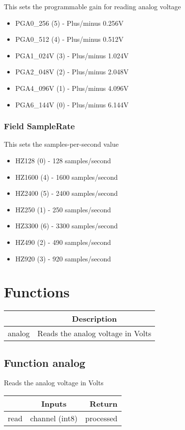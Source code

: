\documentclass[a4paper,12pt,oneside,pdflatex,italian,final,twocolumn]{article}
\begin{document}
This sets the programmable gain for reading analog voltage


\begin{itemize}
\item PGA0\_256 (5) - Plus/minus 0.256V
\item PGA0\_512 (4) - Plus/minus 0.512V
\item PGA1\_024V (3) - Plus/minus 1.024V
\item PGA2\_048V (2) - Plus/minus 2.048V
\item PGA4\_096V (1) - Plus/minus 4.096V
\item PGA6\_144V (0) - Plus/minus 6.144V
\end{itemize}


\raggedright

\subsubsection{Field SampleRate }

This sets the samples-per-second value


\begin{itemize}
\item HZ128 (0) - 128 samples/second
\item HZ1600 (4) - 1600 samples/second
\item HZ2400 (5) - 2400 samples/second
\item HZ250 (1) - 250 samples/second
\item HZ3300 (6) - 3300 samples/second
\item HZ490 (2) - 490 samples/second
\item HZ920 (3) - 920 samples/second
\end{itemize}




\raggedright

\section{Functions}

\centering
\begin{tabular}{lc}
\toprule
  & Description \\
\midrule
analog & Reads the analog voltage in Volts \\
\bottomrule
\end{tabular}


\raggedright
\subsection{Function analog }
Reads the analog voltage in Volts \\

\centering
\begin{tabular}{lcr}
\toprule
  & Inputs & Return \\
\midrule
read &
channel (int8)

&
processed
\\
\bottomrule
\end{tabular}



\raggedright
\end{document}
